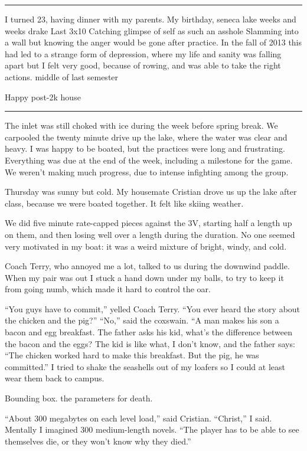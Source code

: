 \plainfancybreak{12pt}{2}{* * *}

I turned 23, having dinner with my parents.
My birthday, seneca lake
weeks and weeks
drake
Last 3x10
Catching glimpse of self as such an asshole
Slamming into a wall but knowing the anger would be gone after practice.  In the
fall of 2013 this had led to a strange form of depression, where my life and
sanity was falling apart but I felt very good, because of rowing, and was able
to take the right actions.
middle of last semester

Happy post-2k house

\plainfancybreak{12pt}{2}{* * *}

The inlet was still choked with ice during the week before spring break.  We
carpooled the twenty minute drive up the lake, where the water was clear and
heavy.  I was happy to be boated, but the practices were long and frustrating.
Everything was due at the end of the week, including a milestone for the game.
We weren't making much progress, due to intense infighting among the group.

Thursday was sunny but cold.  My housemate Cristian drove us up the lake after
class, because we were boated together.  It felt like skiing weather.  

We did five minute rate-capped pieces against the 3V, starting half a length up
on them, and then losing well over a length during the duration.  No one seemed
very motivated in my boat: it was a weird mixture of bright, windy, and cold.

Coach Terry, who annoyed me a lot, talked to us during the downwind
paddle.  When my pair was out I stuck a hand down under my balls, to try to keep
it from going numb, which made it hard to control the oar.

``You guys have to commit,'' yelled Coach Terry.  ``You ever heard the story
about the chicken and the pig?'' ``No,'' said the coxswain.  ``A man makes his
son a bacon and egg breakfast.  The father asks his kid, what's the difference
between the bacon and the eggs?  The kid is like what, I don't know, and the
father says: ``The chicken worked hard to make this breakfast.  But the pig, he
was committed.'' I tried to shake the seashells out of my loafers so I could at
least wear them back to campus. 

Bounding box.  the parameters for death.

``About 300 megabytes on each level load,'' said Cristian.  ``Christ,'' I said.
Mentally I imagined 300 medium-length novels.  ``The player has to be able to
see themselves die, or they won't know why they died.'' 


